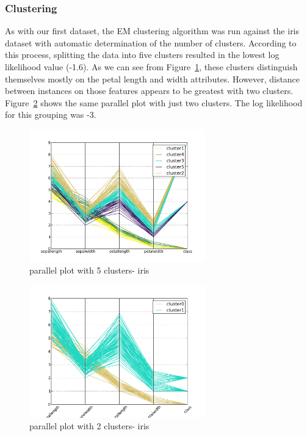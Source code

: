 \documentclass{sig-alternate}
\begin{document}
\subsubsection{Clustering}


As with our first dataset, the EM clustering algorithm was run against the iris dataset with automatic determination of the number of clusters. According to this process, splitting the data into five clusters resulted in the lowest log likelihood value (-1.6). As we can see from Figure~\ref{iris-parallel-cluster-5}, these clusters distinguish themselves mostly on the petal length and width attributes. However, distance between instances on those features appears to be greatest with two clusters. Figure~\ref{iris-parallel-cluster-2} shows the same parallel plot with just two clusters. The log likelihood for this grouping was -3.

\begin{figure}[!htbp]
    \centering
    \includegraphics[width=3in]{part2/iris/parallel-cluster.pdf}
    \caption{parallel plot with 5 clusters- iris\label{iris-parallel-cluster-5}}
\end{figure} 

\begin{figure}[!htbp]
    \centering
    \includegraphics[width=3in]{part2/iris/parallel-cluster-2.pdf}
    \caption{parallel plot with 2 clusters- iris\label{iris-parallel-cluster-2}}
\end{figure} 
\end{document}
